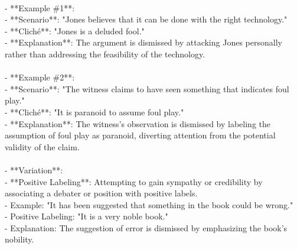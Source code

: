 \documentclass[a4paper,12pt,single,pdftex]{scrbook}
\begin{document}
    
      
    \\

    
      - **Example \#1**:
    \\

    
        - **Scenario**: "Jones believes that it can be done with the right technology."
    \\

    
        - **Cliché**: "Jones is a deluded fool."
    \\

    
        - **Explanation**: The argument is dismissed by attacking Jones personally rather than addressing the feasibility of the technology.
    \\

    
      
    \\

    
      - **Example \#2**:
    \\

    
        - **Scenario**: "The witness claims to have seen something that indicates foul play."
    \\

    
        - **Cliché**: "It is paranoid to assume foul play."
    \\

    
        - **Explanation**: The witness's observation is dismissed by labeling the assumption of foul play as paranoid, diverting attention from the potential validity of the claim.
    \\

    
      
    \\

    
      - **Variation**:
    \\

    
        - **Positive Labeling**: Attempting to gain sympathy or credibility by associating a debater or position with positive labels.
    \\

    
          - Example: "It has been suggested that something in the book could be wrong."
    \\

    
          - Positive Labeling: "It is a very noble book."
    \\

    
          - Explanation: The suggestion of error is dismissed by emphasizing the book's nobility.
    \\
\end{document}

